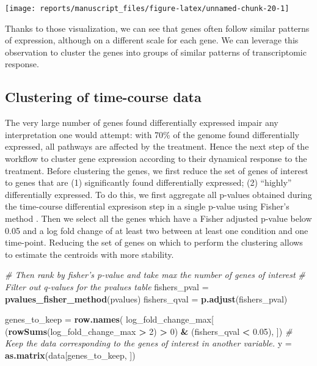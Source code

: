 \documentclass[9pt,a4paper,]{extarticle}
\newenvironment{Shaded}{\begin{snugshade}}{\end{snugshade}}
\newcommand{\CommentTok}[1]{\textcolor[rgb]{0.56,0.35,0.01}{\textit{#1}}}
\newcommand{\DecValTok}[1]{\textcolor[rgb]{0.00,0.00,0.81}{#1}}
\newcommand{\FloatTok}[1]{\textcolor[rgb]{0.00,0.00,0.81}{#1}}
\newcommand{\KeywordTok}[1]{\textcolor[rgb]{0.13,0.29,0.53}{\textbf{#1}}}
\newcommand{\NormalTok}[1]{#1}
\newcommand{\OperatorTok}[1]{\textcolor[rgb]{0.81,0.36,0.00}{\textbf{#1}}}
\newcommand{\StringTok}[1]{\textcolor[rgb]{0.31,0.60,0.02}{#1}}
\begin{document}
\begin{center}\texttt{[image: reports/manuscript\_files/figure-latex/unnamed-chunk-20-1]} \end{center}

Thanks to those visualization, we can see that genes often follow similar
patterns of expression, although on a different scale for each gene. We can
leverage this observation to cluster the genes into groups of similar patterns
of transcriptomic response.

\hypertarget{clustering-of-time-course-data}{%
\subsection{Clustering of time-course data}\label{clustering-of-time-course-data}}

The very large number of genes found differentially expressed impair any
interpretation one would attempt: with 70\% of the genome found differentially
expressed, all pathways are affected by the treatment. Hence the next step of
the workflow to cluster gene expression according to their dynamical response
to the treatment. Before clustering the genes, we first reduce the set of
genes of interest to genes that are (1) significantly found differentially
expressed; (2) ``highly'' differentially expressed. To do this, we first
aggregate all p-values obtained during the time-course differential expresison
step in a single p-value using Fisher's method \citep{fisher:statistical}. Then we
select all the genes which have a Fisher adjusted p-value below 0.05 and a log
fold change of at least two between at least one condition and one time-point.
Reducing the set of genes on which to perform the clustering allows to
estimate the centroids with more stability.

\begin{Shaded}
\begin{Highlighting}[]
\CommentTok{# Then rank by fisher's p-value and take max the number of genes of interest}
\CommentTok{# Filter out q-values for the pvalues table}
\NormalTok{fishers_pval =}\StringTok{ }\KeywordTok{pvalues_fisher_method}\NormalTok{(pvalues)}
\NormalTok{fishers_qval =}\StringTok{ }\KeywordTok{p.adjust}\NormalTok{(fishers_pval)}

\NormalTok{genes_to_keep =}\StringTok{ }\KeywordTok{row.names}\NormalTok{(}
\NormalTok{    log_fold_change_max[}
\NormalTok{    (}\KeywordTok{rowSums}\NormalTok{(log_fold_change_max }\OperatorTok{>}\StringTok{ }\DecValTok{2}\NormalTok{) }\OperatorTok{>}\StringTok{ }\DecValTok{0}\NormalTok{) }\OperatorTok{&}
\StringTok{    }\NormalTok{(fishers_qval }\OperatorTok{<}\StringTok{ }\FloatTok{0.05}\NormalTok{), ])}
\CommentTok{# Keep the data corresponding to the genes of interest in another variable.}
\NormalTok{y =}\StringTok{ }\KeywordTok{as.matrix}\NormalTok{(data[genes_to_keep, ])}
\end{Highlighting}
\end{Shaded}
\end{document}
